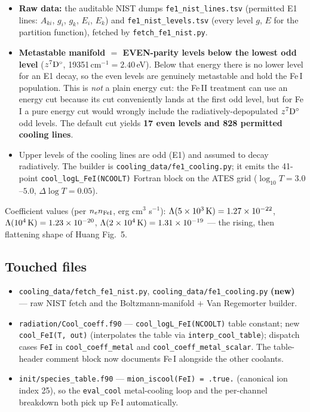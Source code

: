 \documentclass[english,a4paper]{kiseon_memo}
\begin{document}
\begin{itemize}
  \item \textbf{Raw data:} the auditable NIST dumps \texttt{fe1\_nist\_lines.tsv}
    (permitted E1 lines: \(A_{ki}\), \(g_i\), \(g_k\), \(E_i\), \(E_k\)) and
    \texttt{fe1\_nist\_levels.tsv} (every level \(g\), \(E\) for the partition
    function), fetched by \texttt{fetch\_fe1\_nist.py}.
  \item \textbf{Metastable manifold $=$ EVEN-parity levels below the lowest odd
    level} (\(z^7{\rm D}^{\circ}\), 19351\,cm\(^{-1}=2.40\)\,eV). Below that energy
    there is no lower level for an E1 decay, so the even levels are genuinely
    metastable and hold the Fe\,I population. This is \emph{not} a plain energy
    cut: the Fe\,II treatment can use an energy cut because its cut conveniently
    lands at the first odd level, but for Fe\,I a pure energy cut would wrongly
    include the radiatively-depopulated \(z^7{\rm D}^{\circ}\) odd levels. The
    default cut yields \textbf{17 even levels and 828 permitted cooling lines}.
  \item Upper levels of the cooling lines are odd (E1) and assumed to decay
    radiatively. The builder is \texttt{cooling\_data/fe1\_cooling.py}; it emits the
    41-point \verb|cool_logL_FeI(NCOOLT)| Fortran block on the ATES grid
    (\(\log_{10}T = 3.0\)--\(5.0\), \(\Delta\log T = 0.05\)).
\end{itemize}

Coefficient values (per \(n_e n_{\rm FeI}\), erg cm\(^3\) s\(^{-1}\)):
\(\Lambda(5\times10^3\,{\rm K}) = 1.27\times10^{-22}\),
\(\Lambda(10^4\,{\rm K}) = 1.23\times10^{-20}\),
\(\Lambda(2\times10^4\,{\rm K}) = 1.31\times10^{-19}\) --- the rising, then
flattening shape of Huang Fig.~5.

\subsection{Touched files}
\begin{itemize}
  \item \texttt{cooling\_data/fetch\_fe1\_nist.py},
    \texttt{cooling\_data/fe1\_cooling.py} \textbf{(new)} --- raw NIST fetch and the
    Boltzmann-manifold $+$ Van Regemorter builder.
  \item \texttt{radiation/Cool\_coeff.f90} --- \verb|cool_logL_FeI(NCOOLT)| table
    constant; new \verb|cool_FeI(T, out)| (interpolates the table via
    \verb|interp_cool_table|); dispatch cases \verb|FeI| in \verb|cool_coeff_metal|
    and \verb|cool_coeff_metal_scalar|. The table-header comment block now documents
    Fe\,I alongside the other coolants.
  \item \texttt{init/species\_table.f90} --- \verb|mion_iscool(FeI) = .true.|
    (canonical ion index 25), so the \verb|eval_cool| metal-cooling loop and the
    per-channel breakdown both pick up Fe\,I automatically.
\end{itemize}
\end{document}
